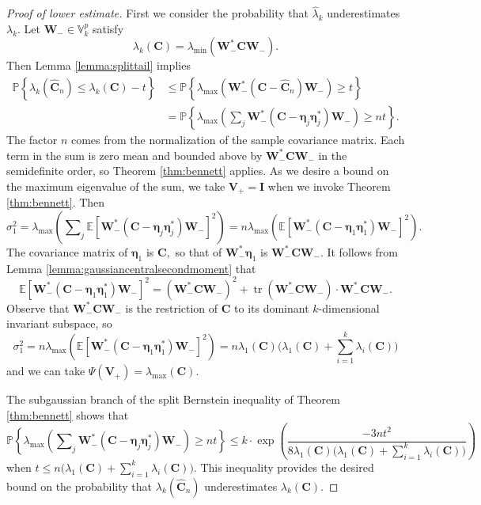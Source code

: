 \documentclass[11pt,letterpaper,twoside,reqno,nosumlimits]{amsart}
\renewcommand{\star}{*}
\newcommand{\mat}[1]{\ensuremath{\bm{#1}}} %
\renewcommand{\vec}[1]{\ensuremath{\bm{#1}}}
\newcommand{\E}{\ensuremath{\mathbb{E}}}
\newcommand{\Prob}[1]{\ensuremath{\mathbb{P}\left\{#1\right\}}}
\newcommand{\randcon}{\ensuremath{\Psi}}
\newcommand{\lambdamax}[1]{\ensuremath{\lambda_{\mathrm{max}}\left(#1\right)}}
\newcommand{\lambdamin}[1]{\ensuremath{\lambda_{\mathrm{min}}\left(#1\right)}}
\newcommand{\Isom}[2]{\ensuremath{\mathbb{V}_{#1}^{#2}}}
\DeclareMathOperator{\tr}{tr}
\theoremstyle{remark}
\numberwithin{equation}{section}
\numberwithin{thm}{section}
\numberwithin{prop}{section}
\numberwithin{defn}{section}
\numberwithin{remark}{section}
\begin{document}
\begin{proof}[Proof of lower estimate]

First we consider the probability that $\hat{\lambda}_k$ underestimates $\lambda_k$. Let $\mat{W}_- \in \Isom{k}{p}$ satisfy
\[
 \lambda_k(\mat{C}) = \lambdamin{\mat{W}_-^\star \mat{C} \mat{W}_-}.
\]
Then Lemma \ref{lemma:splittail} implies
\begin{align*}
 \Prob{\lambda_k(\widehat{\mat{C}}_n) \leq \lambda_k(\mat{C}) - t} & \leq \Prob{\lambdamax{\mat{W}_-^\star (\mat{C} - \widehat{\mat{C}}_n) \mat{W}_-} \geq t} \\
& = \Prob{ \lambdamax{\sum\nolimits_j \mat{W}_-^\star(\mat{C} - \vec{\eta}_j\vec{\eta}_j^\star ) \mat{W}_-} \geq nt}.
\end{align*}
The factor $n$ comes from the normalization of the sample covariance matrix. Each term in the sum is zero mean and bounded above by $\mat{W}_-^*\mat{C}\mat{W}_-$ in the semidefinite order, so Theorem \ref{thm:bennett} applies. As we desire a bound on the maximum eigenvalue of the sum, we take $\mat{V}_+ = \mathbf{I}$ when we invoke Theorem \ref{thm:bennett}. Then 
\[
 \sigma_1^2 = \lambdamax{ \sum\nolimits_j \E\left[\mat{W}_-^\star(\mat{C} - \vec{\eta}_j\vec{\eta}_j^\star)\mat{W}_-\right]^2 } = n \lambdamax{\E\left[\mat{W}_-^\star(\mat{C} - \vec{\eta}_1\vec{\eta}_1^\star)\mat{W}_-\right]^2}.
\]
The covariance matrix of $\vec{\eta}_1$ is $\mat{C},$ so that of $\mat{W}_-^\star \vec{\eta}_1$ is $\mat{W}_-^\star \mat{C} \mat{W}_-.$ It follows from  Lemma \ref{lemma:gaussiancentralsecondmoment} that
\[
\E\left[\mat{W}_-^*(\mat{C} - \vec{\eta}_1\vec{\eta}_1^\star)\mat{W}_-\right]^2 = (\mat{W}_-^*\mat{C}\mat{W}_-)^2 + \tr(\mat{W}_-^*\mat{C}\mat{W}_-) \cdot \mat{W}_-^*\mat{C}\mat{W}_-.
\]
Observe that $\mat{W}_-^*\mat{C}\mat{W}_-$ is the restriction of $\mat{C}$ to its dominant $k$-dimensional invariant subspace, so
\[
 \sigma_1^2 = n \lambdamax{\E\left[\mat{W}_-^\star(\mat{C} - \vec{\eta}_1\vec{\eta}_1^\star)\mat{W}_-\right]^2} = n\lambda_1(\mat{C}) \big( \lambda_1(\mat{C}) + \sum_{i=1}^k \lambda_i(\mat{C}) \big) 
\]
and we can take $\randcon(\mat{V}_+) = \lambdamax{\mat{C}}.$

The subgaussian branch of the split Bernstein inequality of Theorem \ref{thm:bennett} shows that 
\begin{equation*}
 \Prob{ \lambdamax{\sum\nolimits_j \mat{W}_-^\star(\mat{C} - \vec{\eta}_j\vec{\eta}_j^\star ) \mat{W}_-} \geq nt} \leq 
 k \cdot \exp\left( \displaystyle \frac{-3nt^2}{8 \lambda_1(\mat{C}) \big(\lambda_1(\mat{C}) + \sum_{i=1}^k \lambda_i(\mat{C}) \big) } \right)
\end{equation*}
when  $t \leq n\big(\lambda_1(\mat{C}) + \sum_{i=1}^k \lambda_i(\mat{C})\big).$ This inequality provides the desired bound on the probability that $\lambda_k(\widehat{\mat{C}}_n)$ underestimates $\lambda_k(\mat{C})$.
\end{proof}
\end{document}
